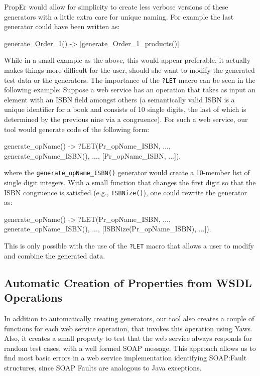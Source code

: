 \documentclass[copyright]{eptcs}
\newcommand{\LET}{\texttt{?LET}\xspace}
\begin{document}
PropEr would allow for simplicity to create less verbose versions of
these generators with a little extra care for unique naming. For
example the last generator could have been written as:

\begin{lsterlang}[firstnumber=35]
generate_Order_1() ->
  [generate_Order_1_products()].
\end{lsterlang}

While in a small example as the above, this would appear preferable,
it actually makes things more difficult for the user, should she want
to modify the generated test data or the generators. The importance of
the \LET macro can be seen in the following example: Suppose a web
service has an operation that takes as input an element with an ISBN
field amongst others (a semantically valid ISBN is a unique identifier
for a book and consists of 10 single digits, the last of which is
determined by the previous nine via a congruence). For such a web
service, our tool would generate code of the following form:
\begin{lsterlang}[numbers=none]
generate_opName() ->
  ?LET({Pr_opName_ISBN, ...},
        {generate_opName_ISBN(), ...},
        [Pr_opName_ISBN, ...]).
\end{lsterlang}
where the \texttt{generate\_opName\_ISBN()} generator would create a
10-member list of single digit integers. With a small function that
changes the first digit so that the ISBN congruence is satisfied (e.g.,
\texttt{ISBNize()}), one could rewrite the generator as:
\begin{lsterlang}[numbers=none]
generate_opName() ->
  ?LET({Pr_opName_ISBN, ...},
        {generate_opName_ISBN(), ...},
        [ISBNize(Pr_opName_ISBN), ...]).
\end{lsterlang}
This is only possible with the use of the \LET macro that allows a user to
modify and combine the generated data. 

\subsection{Automatic Creation of Properties from WSDL Operations}

In addition to automatically creating generators, our tool also
creates a couple of functions for each web service operation, that
invokes this operation using Yaws. Also, it creates a small property
to test that the web service always responds for random test cases, with a
well formed SOAP message. This approach allows us to find most basic
errors in a web service implementation identifying SOAP:Fault
structures, since SOAP Faults are analogous to Java exceptions.
\end{document}
